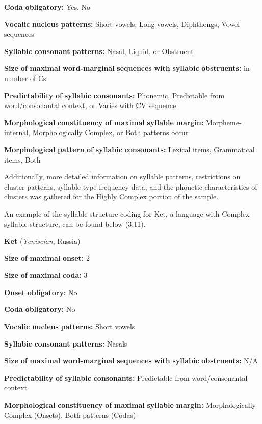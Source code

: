 \textbf{Coda} \textbf{obligatory:} Yes, No

\textbf{Vocalic} \textbf{nucleus} \textbf{patterns:} Short vowels, Long vowels, Diphthongs, Vowel sequences

\textbf{Syllabic} \textbf{consonant} \textbf{patterns:} Nasal, Liquid, or Obstruent

\textbf{Size} \textbf{of} \textbf{maximal} \textbf{word-marginal} \textbf{sequences} \textbf{with} \textbf{syllabic} \textbf{obstruents:} in number of Cs

\textbf{Predictability} \textbf{of} \textbf{syllabic} \textbf{consonants:} Phonemic, Predictable from word/consonantal context, or Varies with CV sequence

\textbf{Morphological} \textbf{constituency} \textbf{of} \textbf{maximal} \textbf{syllable} \textbf{margin:} Morpheme-internal, Morphologically Complex, or Both patterns occur

\textbf{Morphological} \textbf{pattern} \textbf{of} \textbf{syllabic} \textbf{consonants:} Lexical items, Grammatical items, Both

  Additionally, more detailed information on syllable patterns, restrictions on cluster patterns, syllable type frequency data, and the phonetic characteristics of clusters was gathered for the Highly Complex portion of the sample.

  An example of the syllable structure coding for Ket, a language with Complex syllable structure, can be found below (3.11).

\ea\label{ex:(3.11)}
  \textbf{Ket} (\textit{Yeniseian}; Russia)

\textbf{Size} \textbf{of} \textbf{maximal} \textbf{onset:} 2

\textbf{Size} \textbf{of} \textbf{maximal} \textbf{coda:} 3

\textbf{Onset} \textbf{obligatory:} No

\textbf{Coda} \textbf{obligatory:} No

\textbf{Vocalic} \textbf{nucleus} \textbf{patterns:} Short vowels

\textbf{Syllabic} \textbf{consonant} \textbf{patterns:} Nasals

\textbf{Size} \textbf{of} \textbf{maximal} \textbf{word-marginal} \textbf{sequences} \textbf{with} \textbf{syllabic} \textbf{obstruents:} N/A

\textbf{Predictability} \textbf{of} \textbf{syllabic} \textbf{consonants:} Predictable from word/consonantal context

\textbf{Morphological} \textbf{constituency} \textbf{of} \textbf{maximal} \textbf{syllable} \textbf{margin:} Morphologically Complex (Onsets), Both patterns (Codas)

